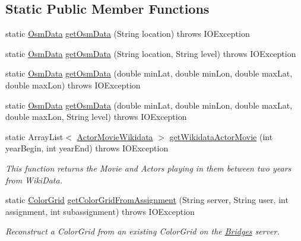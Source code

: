 \subsection*{Static Public Member Functions}
\begin{DoxyCompactItemize}
\item 
static \hyperlink{classbridges_1_1data__src__dependent_1_1_osm_data}{Osm\+Data} \hyperlink{classbridges_1_1connect_1_1_data_source_a836aff0a3c4003cbc21d65d949d5f985}{get\+Osm\+Data} (String location)  throws I\+O\+Exception 
\item 
static \hyperlink{classbridges_1_1data__src__dependent_1_1_osm_data}{Osm\+Data} \hyperlink{classbridges_1_1connect_1_1_data_source_a92e5a1b0104cce618012c4ec9c84e8aa}{get\+Osm\+Data} (String location, String level)  throws I\+O\+Exception 
\item 
static \hyperlink{classbridges_1_1data__src__dependent_1_1_osm_data}{Osm\+Data} \hyperlink{classbridges_1_1connect_1_1_data_source_ae14038856a8b48b0b75ddd43f58059ad}{get\+Osm\+Data} (double min\+Lat, double min\+Lon, double max\+Lat, double max\+Lon)  throws I\+O\+Exception 
\item 
static \hyperlink{classbridges_1_1data__src__dependent_1_1_osm_data}{Osm\+Data} \hyperlink{classbridges_1_1connect_1_1_data_source_a30e8c815c2d2bab1ef62fa5bea27b42d}{get\+Osm\+Data} (double min\+Lat, double min\+Lon, double max\+Lat, double max\+Lon, String level)  throws I\+O\+Exception 
\item 
static Array\+List$<$ \hyperlink{classbridges_1_1data__src__dependent_1_1_actor_movie_wikidata}{Actor\+Movie\+Wikidata} $>$ \hyperlink{classbridges_1_1connect_1_1_data_source_ad06946cc793bb990eeb3b9418ade1479}{get\+Wikidata\+Actor\+Movie} (int year\+Begin, int year\+End)  throws I\+O\+Exception 
\begin{DoxyCompactList}\small\item\em This function returns the Movie and Actors playing in them between two years from Wiki\+Data. \end{DoxyCompactList}\item 
static \hyperlink{classbridges_1_1base_1_1_color_grid}{Color\+Grid} \hyperlink{classbridges_1_1connect_1_1_data_source_a46104188d82c85573d1da98a5f379bd5}{get\+Color\+Grid\+From\+Assignment} (String server, String user, int assignment, int subassignment)  throws I\+O\+Exception 
\begin{DoxyCompactList}\small\item\em Reconstruct a Color\+Grid from an existing Color\+Grid on the \hyperlink{classbridges_1_1connect_1_1_bridges}{Bridges} server. \end{DoxyCompactList}\item 

\end{DoxyCompactItemize}
